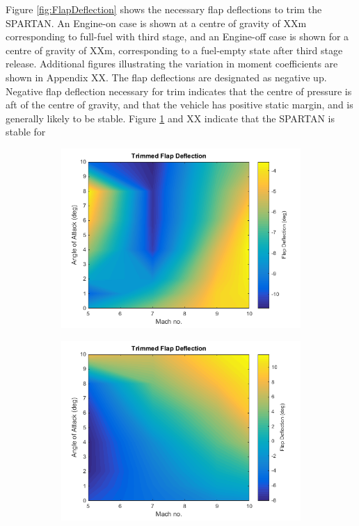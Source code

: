 Figure \ref{fig:FlapDeflection} shows the necessary flap deflections to trim the SPARTAN. An Engine-on case is shown at a centre of gravity of  XXm corresponding to full-fuel with third stage, and an Engine-off case is shown for a centre of gravity of XXm, corresponding to a fuel-empty state after third stage release. Additional figures illustrating the variation in moment coefficients are shown in Appendix XX.
The flap deflections are designated as negative up. Negative flap deflection necessary for trim indicates that the centre of pressure is aft of the centre of gravity, and that the vehicle has positive static margin, and is generally likely to be stable. Figure \ref{fig:FlapDeflectionENgineOn} and XX indicate that the SPARTAN is stable for 

\begin{figure}
\begin{subfigure}{.5\textwidth}
\centering
\includegraphics[width=0.99\linewidth]{figures/3_vehicle_design/FlapDeflectionENgineOn}
\caption{}
\label{fig:FlapDeflectionENgineOn}
\end{subfigure}
\begin{subfigure}{.5\textwidth}
	\centering
	\includegraphics[width=0.99\linewidth]{figures/3_vehicle_design/FlapDeflectionENgineOn2}

\end{subfigure}
\end{figure}
